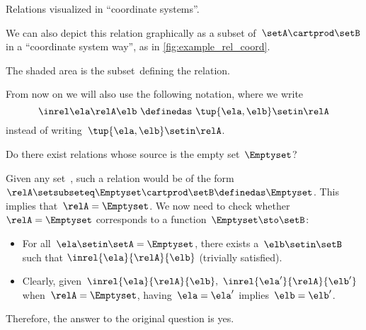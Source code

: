 \begin{marginfigure}
    \centering
    \caption{Relations visualized in ``coordinate systems''.}
    \label{fig:example_rel_coord}
\end{marginfigure}

We can also depict this relation graphically as a subset of~$\setA \cartprod \setB$ in a ``coordinate system way'', as in \cref{fig:example_rel_coord}.

The shaded area is the subset~\relA defining the relation.

\begin{remark}
    From now on we will also use the following notation, where we write
    \begin{equation}
        \inrel \ela \relA \elb \ \definedas\  \tup{\ela,\elb}\setin \relA
    \end{equation}
    instead of writing~$\tup{\ela,\elb}\setin \relA$.
\end{remark}

\begin{exercise}
    Do there exist relations whose source is the empty set~$\Emptyset$?
\end{exercise}
\begin{solution}

    Given any set~\setB, such a relation would be of the form~$\relA \setsubseteq \Emptyset \cartprod \setB \definedas \Emptyset$.
    This implies that~$\relA=\Emptyset$.
    We now need to check whether~$\relA=\Emptyset$ corresponds to a function~$\Emptyset\sto \setB$:
    \begin{itemize}
        \item For all~$\ela\setin \setA=\Emptyset$, there exists a~$\elb \setin \setB$ such that $\inrel{\ela}{\relA}{\elb}$ (trivially satisfied).
        \item Clearly, given~$\inrel{\ela}{\relA}{\elb},~\inrel{\ela'}{\relA}{\elb'}$ when~$\relA=\Emptyset$, having~$\ela=\ela'$ implies~$\elb=\elb'$.
    \end{itemize}
    Therefore, the answer to the original question is yes.
\end{solution}

